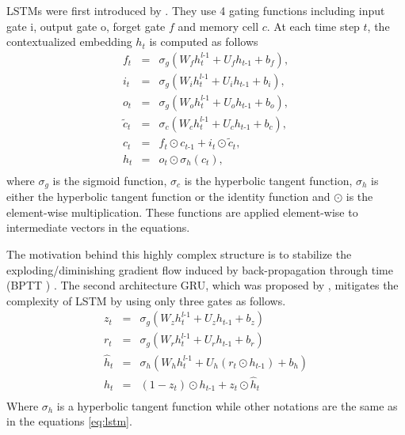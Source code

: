 LSTMs were first introduced by \citet{Hochreiter97long}. They use 4 gating functions including input gate i, output gate o, forget gate $f$ and memory cell $c$. At each time step $t$, the contextualized embedding $h_t$ is computed as follows
\begin{equation}
\label{eq:lstm}
\begin{array}{rcl}
f_t &=& \sigma_g (W_f h^{l\text{-}1}_t + U_f h_{t\text{-}1} + b_f),\\
i_t &=& \sigma_g (W_i h^{l\text{-}1}_t + U_i h_{t\text{-}1} + b_i),\\
o_t &=& \sigma_g (W_o h^{l\text{-}1}_t + U_o h_{t\text{-}1} + b_o),\\
\tilde{c}_t &=& \sigma_c (W_c h^{l\text{-}1}_t + U_c h_{t\text{-}1} + b_c),\\
c_t &=& f_t \odot c_{t\text{-}1} + i_t \odot \tilde{c}_t,\\
h_t &=& o_t \odot \sigma_h(c_t),\\
\end{array}
\end{equation}
where $\sigma_g$ is the sigmoid function, $\sigma_c$ is the hyperbolic tangent function, $\sigma_h$ is either the hyperbolic tangent function or the identity function and $\odot$ is the element-wise multiplication. These functions are applied element-wise to intermediate vectors in the equations.

The motivation behind this highly complex structure is to stabilize the exploding/diminishing gradient flow \citep{Pascanu13onthe} induced by back-propagation through time (BPTT ) \citep{Hochreiter97long}. The second architecture GRU, which was proposed by \citet{Cho14properties}, mitigates the complexity of LSTM by using only three gates as follows.
\begin{equation}
\label{eq:gru}
\begin{array}{rcl}
z_t &=& \sigma_g (W_z h^{l\text{-}1}_t + U_z h_{t\text{-}1} + b_z)\\
r_t &=& \sigma_g (W_r h^{l\text{-}1}_t + U_r h_{t\text{-}1} + b_r)\\
\hat{h}_t &=& \sigma_h (W_h h^{l\text{-}1}_t + U_h (r_t \odot h_{t\text{-}1}) + b_h)\\
h_t &=& (1-z_t)\odot h_{t\text{-}1} + z_t \odot \hat{h}_t\\
\end{array}
\end{equation}
Where $\sigma_h$ is a hyperbolic tangent function while other notations are the same as in the equations \ref{eq:lstm}.
